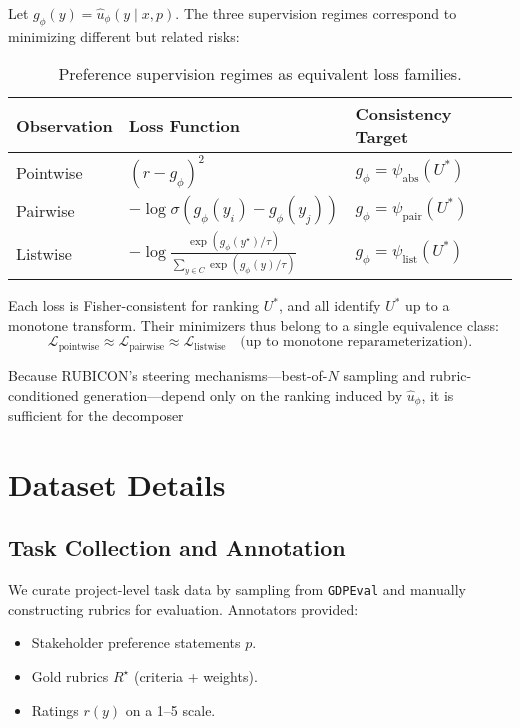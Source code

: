 \documentclass[sigconf]{acmart}
\begin{document}
Let \(g_\phi(y) = \hat{u}_\phi(y \mid x, p)\).
The three supervision regimes correspond to minimizing different but related risks:

\begin{table}[h]
\centering
\caption{Preference supervision regimes as equivalent loss families.}
\begin{tabular}{lll}
\toprule
\textbf{Observation} & \textbf{Loss Function} & \textbf{Consistency Target} \\
\midrule
Pointwise & $(r - g_\phi)^2$ & $g_\phi = \psi_{\mathrm{abs}}(U^*)$ \\
Pairwise  & $-\log \sigma(g_\phi(y_i) - g_\phi(y_j))$ & $g_\phi = \psi_{\mathrm{pair}}(U^*)$ \\
Listwise  & $-\log \frac{\exp(g_\phi(y^\star)/\tau)}{\sum_{y \in C} \exp(g_\phi(y)/\tau)}$ & $g_\phi = \psi_{\mathrm{list}}(U^*)$ \\
\bottomrule
\end{tabular}
\end{table}

Each loss is Fisher-consistent for ranking \(U^*\), and all identify \(U^*\) up to a monotone transform.
Their minimizers thus belong to a single equivalence class:
\[
\mathcal{L}_{\mathrm{pointwise}} \approx
\mathcal{L}_{\mathrm{pairwise}} \approx
\mathcal{L}_{\mathrm{listwise}}
\quad
\text{(up to monotone reparameterization).}
\]


Because RUBICON’s steering mechanisms—best-of-\(N\) sampling and rubric-conditioned generation—depend only on the ranking induced by \(\hat{u}_\phi\),
it is sufficient for the decomposer

\section{Dataset Details}
\label{appendix:dataset}

\subsection{Task Collection and Annotation}
We curate project-level task data by sampling from \texttt{GDPEval} and manually constructing rubrics for evaluation.
Annotators provided:
\begin{itemize}
    \item Stakeholder preference statements $p$.
    \item Gold rubrics $R^\star$ (criteria + weights).
    \item Ratings $r(y)$ on a 1–5 scale.
\end{itemize}
\end{document}
